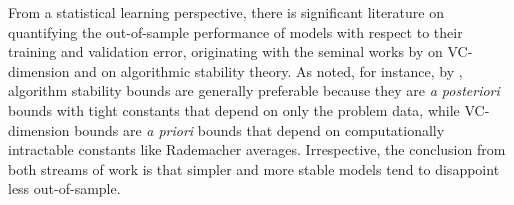\documentclass[mnsc,nonblindrev]{informs3} %
\begin{document}
From a statistical learning perspective, there is significant literature %
on quantifying the out-of-sample performance of models with respect to their training and validation error, originating with the seminal works by \cite{vapnik1999overview} on VC-dimension and \cite{bousquet2002stability} on algorithmic stability theory. %
As noted, for instance, by \cite{ban2019big}, algorithm stability bounds are generally preferable because they are \textit{a posteriori} bounds with tight constants that depend on only the problem data, while VC-dimension bounds are \textit{a priori} bounds that depend on computationally intractable constants like Rademacher averages. Irrespective, the conclusion from both streams of work is that simpler and more stable models tend to disappoint less out-of-sample. %

\end{document}
